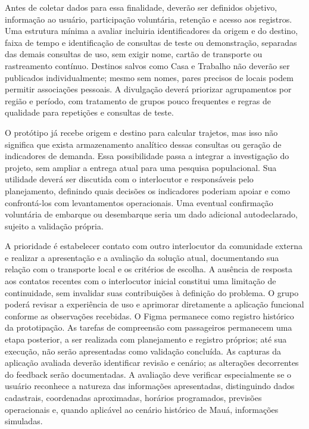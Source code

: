 \documentclass[12pt,oneside,a4paper,brazil,chapter=TITLE]{abntex2}
\begin{document}
Antes de coletar dados para essa finalidade, deverão ser definidos objetivo, informação ao usuário, participação voluntária, retenção e acesso aos registros. Uma estrutura mínima a avaliar incluiria identificadores da origem e do destino, faixa de tempo e identificação de consultas de teste ou demonstração, separadas das demais consultas de uso, sem exigir nome, cartão de transporte ou rastreamento contínuo. Destinos salvos como Casa e Trabalho não deverão ser publicados individualmente; mesmo sem nomes, pares precisos de locais podem permitir associações pessoais. A divulgação deverá priorizar agrupamentos por região e período, com tratamento de grupos pouco frequentes e regras de qualidade para repetições e consultas de teste.

O protótipo já recebe origem e destino para calcular trajetos, mas isso não significa que exista armazenamento analítico dessas consultas ou geração de indicadores de demanda. Essa possibilidade passa a integrar a investigação do projeto, sem ampliar a entrega atual para uma pesquisa populacional. Sua utilidade deverá ser discutida com o interlocutor e responsáveis pelo planejamento, definindo quais decisões os indicadores poderiam apoiar e como confrontá-los com levantamentos operacionais. Uma eventual confirmação voluntária de embarque ou desembarque seria um dado adicional autodeclarado, sujeito a validação própria.

A prioridade é estabelecer contato com outro interlocutor da comunidade externa e realizar a apresentação e a avaliação da solução atual, documentando sua relação com o transporte local e os critérios de escolha. A ausência de resposta aos contatos recentes com o interlocutor inicial constitui uma limitação de continuidade, sem invalidar suas contribuições à definição do problema. O grupo poderá revisar a experiência de uso e aprimorar diretamente a aplicação funcional conforme as observações recebidas. O Figma permanece como registro histórico da prototipação. As tarefas de compreensão com passageiros permanecem uma etapa posterior, a ser realizada com planejamento e registro próprios; até sua execução, não serão apresentadas como validação concluída. As capturas da aplicação avaliada deverão identificar revisão e cenário; as alterações decorrentes do feedback serão documentadas. A avaliação deve verificar especialmente se o usuário reconhece a natureza das informações apresentadas, distinguindo dados cadastrais, coordenadas aproximadas, horários programados, previsões operacionais e, quando aplicável ao cenário histórico de Mauá, informações simuladas.
\end{document}
